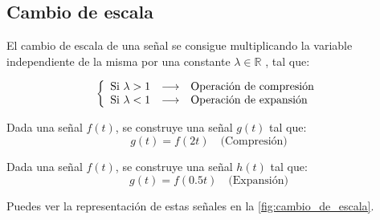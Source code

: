 \documentclass[a4paper]{book}
\begin{document}
\subsection{Cambio de escala}

El cambio de escala de una señal se consigue multiplicando la variable independiente de la misma por una constante $\lambda \in \mathbb{R}$ , tal que:

\[\left\{ \begin{array}{l c l}
\textrm{Si } \lambda > 1 & \longrightarrow & \textrm{Operación de compresión} \\
\textrm{Si } \lambda < 1 & \longrightarrow & \textrm{Operación de expansión}
\end{array} \right.
\]

\begin{ejemplo}
	Dada una señal $f(t)$, se construye una señal $g(t)$ tal que: \[g(t) = f(2t) \quad \textrm{(Compresión)} \]
\end{ejemplo}

\begin{ejemplo}
	Dada una señal $f(t)$, se construye una señal $h(t)$ tal que: \[g(t) = f(0.5t) \quad \textrm{(Expansión)}\]
\end{ejemplo}

Puedes ver la representación de estas señales en la \autoref{fig:cambio_de_escala}.
\end{document}

